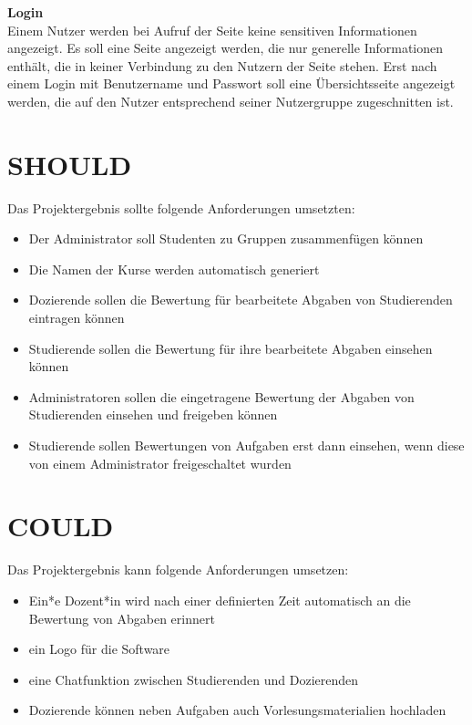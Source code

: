 \textbf{Login} \\
Einem Nutzer werden bei Aufruf der Seite keine sensitiven Informationen angezeigt. 
Es soll eine Seite angezeigt werden, die nur generelle Informationen enthält, die in keiner Verbindung zu den Nutzern der Seite stehen. 
Erst nach einem Login mit Benutzername und Passwort soll eine Übersichtsseite angezeigt werden, die auf den Nutzer entsprechend seiner Nutzergruppe zugeschnitten ist. 

\section{SHOULD}
Das Projektergebnis sollte folgende Anforderungen umsetzten:
\begin{itemize}
\item Der Administrator soll Studenten zu Gruppen zusammenfügen können
\item Die Namen der Kurse werden automatisch generiert
\item Dozierende sollen die Bewertung für bearbeitete Abgaben von Studierenden eintragen können
\item Studierende sollen die Bewertung für ihre bearbeitete Abgaben einsehen können
\item Administratoren sollen die eingetragene Bewertung der Abgaben von Studierenden einsehen und freigeben können
\item Studierende sollen Bewertungen von Aufgaben erst dann einsehen, wenn diese von einem Administrator freigeschaltet wurden
\end{itemize}


\section{COULD}
Das Projektergebnis kann folgende Anforderungen umsetzen:
\begin{itemize}
\item Ein*e Dozent*in wird nach einer definierten Zeit automatisch an die Bewertung von Abgaben erinnert
\item ein Logo für die Software
\item eine Chatfunktion zwischen Studierenden und Dozierenden
\item Dozierende können neben Aufgaben auch Vorlesungsmaterialien hochladen
\end{itemize}





